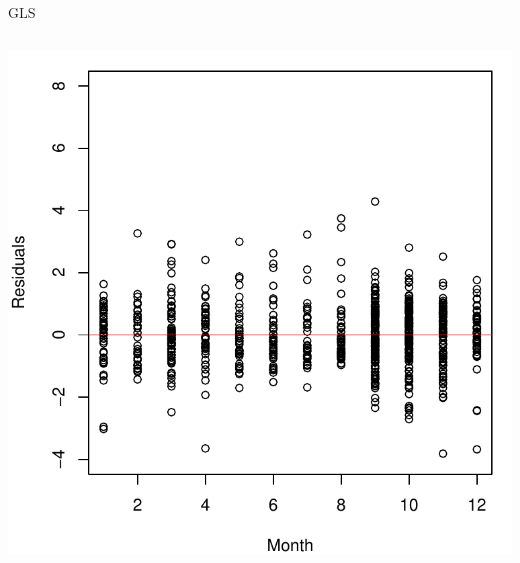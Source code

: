 \documentclass{beamer}\usepackage[]{graphicx}\usepackage[]{color}
\newenvironment{knitrout}{}{} %
\renewenvironment{knitrout}{\setlength{\topsep}{0mm}}{}
\begin{document}
\begin{frame}[fragile]{GLS}
\begin{columns}[c]
\begin{knitrout}
\includegraphics[width=0.7\linewidth]{figure/glsp3-2} 

\end{knitrout}

\end{columns}

\end{frame}
\end{document}
